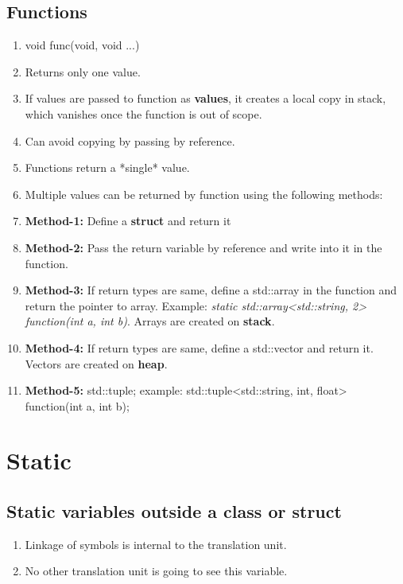 \documentclass{article}
\begin{document}
    \subsection{Functions}
        \begin{enumerate}
            \item void func(void, void ...)
            \item Returns only one value.
            \item If values are passed to function as \textbf{values}, it creates a local copy in stack, which vanishes once the function is out of scope.
            \item Can avoid copying by passing by reference.
            \item Functions return a *single* value. 
            \item Multiple values can be returned by function using the following methods:
            \item \textbf{Method-1: } Define a \textbf{struct} and return it
            \item \textbf{Method-2: } Pass the return variable by reference and write into it in the function.
            \item \textbf{Method-3: } If return types are same, define a std::array in the function and return the pointer to array. Example: \textit{static std::array<std::string, 2> function(int a, int b)}. Arrays are created on \textbf{stack}.
            \item \textbf{Method-4: } If return types are same, define a std::vector and return it. Vectors are created on \textbf{heap}.
            \item \textbf{Method-5: } std::tuple; example: std::tuple<std::string, int, float> function(int a, int b);
            
        \end{enumerate}

    
\section{Static}

    \subsection{Static variables outside a class or struct}
        \begin{enumerate}
        \item Linkage of symbols is internal to the translation unit. 
        \item No other translation unit is going to see this variable.
        \end{enumerate}
        
\end{document}
